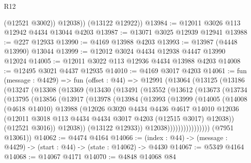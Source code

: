 \begin{lexlean}{R12}
\begin{coremodule}
            (@12521 @3002))
          @12038))
      (@13122 @12922))
@13984 := @12011 @3026 @113 @12942 @4434 @13044 @4203
@13987 := @13071 @3025 @12939 @12941
@13988 := @227 @12933
@13990 := @4169 @13988 @4203
@13993 := @13987 (@4448 @13990) @13044
@13999 := @12012 @3024 @4434 @12938 @4447 @13990 @12024
@14005 := @12011 @3022 @113 @12936 @4434 @13988 @4203
@14008 := @12495 @3021 @4437 @12935
@14010 := @4169 @3017 @4203
@14061 := fun (message : @4429) =>
  fun (offset : @44) =>
  @12991
    (@13064
      (@13125
        (@13186
          (@13247
            (@13308
              (@13369
                (@13430
                  (@13491
                    (@13552
                      (@13612
                        (@13673
                          (@13734
                            (@13795
                              (@13856
                                (@13917
                                  (@13978
                                    (@13984
                                      (@13993
                                        (@13999
                                          (@14005
                                            (@14008
                                              (@4618 @14010)
                                              @13988
                                              (@12026
                                                @3020
                                                @4434
                                                @4436
                                                @4617
                                                @14010
                                                @12036
                                                (@12011
                                                  @3018
                                                  @113
                                                  @4434
                                                  @4434
                                                  @3017
                                                  @4203
                                                  (@12515 @3017)
                                                  @12038))
                                              (@12521 @3016))
                                            @12038))
                                        (@13122 @12933))
                                      @12038))))))))))))))))
      (@7951 @13061))
@14062 := @4474 @4164
@14066 := (index : @44) -> (message : @4429) -> (start : @44) -> (state : @14062) -> @4430
@14067 := @5349 @4164
@14068 := @14067 @4171
@14070 := @4848 @14068 @84

\end{coremodule}
\end{lexlean}
